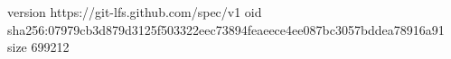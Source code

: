 version https://git-lfs.github.com/spec/v1
oid sha256:07979cb3d879d3125f503322eec73894feaeece4ee087bc3057bddea78916a91
size 699212
